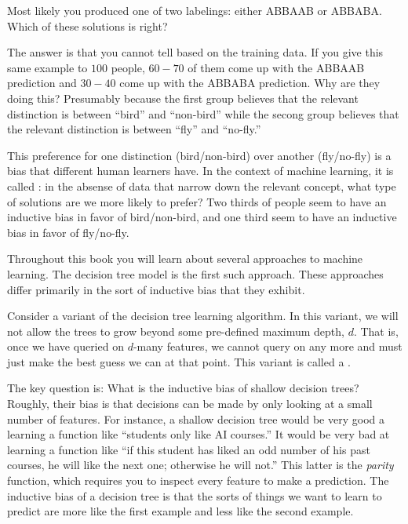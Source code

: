 Most likely you produced one of two labelings: either ABBAAB or
ABBABA.  Which of these solutions is right?

The answer is that you cannot tell based on the training data.  If you
give this same example to $100$ people, $60-70$ of them come up with
the ABBAAB prediction and $30-40$ come up with the ABBABA prediction.
Why are they doing this?  Presumably because the first group believes
that the relevant distinction is between ``bird'' and ``non-bird''
while the secong group believes that the relevant distinction is
between ``fly'' and ``no-fly.''

This preference for one distinction (bird/non-bird) over another
(fly/no-fly) is a bias that different human learners have.  In the
context of machine learning, it is called : in
the absense of data that narrow down the relevant concept, what type
of solutions are we more likely to prefer?  Two thirds of people seem
to have an inductive bias in favor of bird/non-bird, and one third
seem to have an inductive bias in favor of fly/no-fly.


Throughout this book you will learn about several approaches to
machine learning.  The decision tree model is the first such
approach.  These approaches differ primarily in the sort of inductive
bias that they exhibit.

Consider a variant of the decision tree learning algorithm.  In this
variant, we will not allow the trees to grow beyond some pre-defined
maximum depth, $d$.  That is, once we have queried on $d$-many
features, we cannot query on any more and must just make the best
guess we can at that point.  This variant is called a .

The key question is: What is the inductive bias of shallow decision
trees?  Roughly, their bias is that decisions can be made by only
looking at a small number of features.  For instance, a shallow
decision tree would be very good a learning a function like ``students
only like AI courses.''  It would be very bad at learning a function
like ``if this student has liked an odd number of his past courses, he
will like the next one; otherwise he will not.''  This latter is the
\emph{parity} function, which requires you to inspect every feature to
make a prediction.  The inductive bias of a decision tree is that the
sorts of things we want to learn to predict are more like the first
example and less like the second example.


